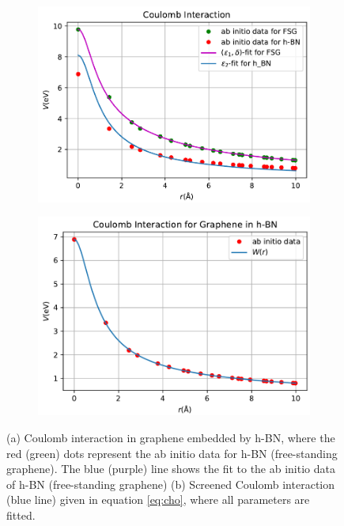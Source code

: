 \begin{figure}[H]
\centering
\begin{subfigure}[b]{.49\textwidth}
  \centering
  \includegraphics[width=\textwidth]{img/cho_2018_BN.pdf}
  \caption{}
  \label{fig:BN_coul}
\end{subfigure}
\hfill
\begin{subfigure}[b]{.49\textwidth}
  \centering
  \includegraphics[width=\textwidth]{img/cho_2018_BN_all.pdf}
  \caption{}
  \label{fig:BN_coul_final}
\end{subfigure}
\caption{(a) Coulomb interaction in graphene embedded by h-BN, where the red (green) dots represent the ab initio data for h-BN (free-standing graphene). The blue (purple) line shows the fit to the ab initio data of h-BN (free-standing graphene) (b) Screened Coulomb interaction (blue line) given in equation \ref{eq:cho}, where all parameters are fitted.}
\end{figure}

